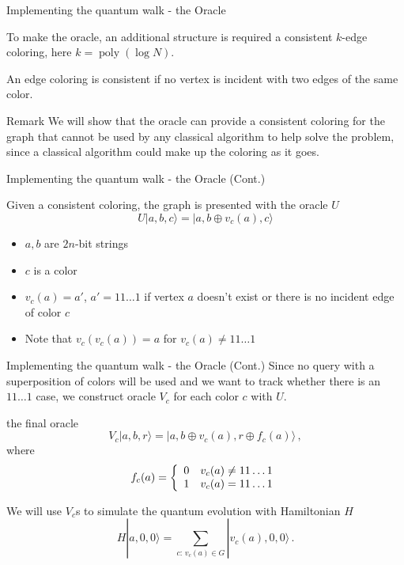 \documentclass{beamer}
\makeatletter
\newcommand{\<}{\langle}
\renewcommand{\>}{\rangle}
\newcommand{\be}{\begin{equation}}
\newcommand{\ee}{\end{equation}}
\newcommand{\cond}[1]{\left\{\begin{array}{l@{~~~}l}#1\end{array}\right.}
\newcommand{\poly}{\mathop{\mathrm{poly}}\nolimits}
\makeatother
\begin{document}
\begin{frame}{Implementing the quantum walk - the Oracle }

\begin{alertblock}{}
To make the oracle, an additional structure is required \newline 
a consistent $k$-edge coloring, here $k=\poly(\log N)$.
\end{alertblock}

\begin{definition}
An edge coloring is consistent if no vertex is incident with two edges of the same color.
\end{definition}

\begin{block}{Remark}
We will show that the oracle can provide a consistent coloring for the graph that cannot be used by any classical algorithm to help solve the problem, since a classical algorithm could make up the coloring as it goes. 
\end{block}

\end{frame}

\begin{frame}{Implementing the quantum walk - the Oracle (Cont.) }

\begin{block}{}
Given a consistent coloring, the graph is presented with the oracle $U$
\be
  U |a,b,c\> = |a,b \oplus v_c(a),c\>
\label{eq:graphoracle}
\ee
\begin{itemize}
    \item $a, b$ are $2n$-bit strings
    \item $c$ is a color
    \item $v_c(a) = a'$, $a'=11\ldots1$ if vertex $a$ doesn't exist or there is no incident edge of color $c$
    \item Note that  $v_c(v_c(a))=a$ for $v_c(a) \ne 11\ldots1$
    
\end{itemize}
\end{block}

\end{frame}


\begin{frame}{Implementing the quantum walk - the Oracle (Cont.) }
Since no query with a superposition of colors will be used and we want to track whether there is an $11\ldots1$ case, we construct oracle $V_c$ for each color $c$ with $U$.
\begin{block}{the final oracle}
\be
  V_c|a,b,r\> = |a,b \oplus v_c(a),r \oplus f_c(a)\>
\,,
\label{eq:simpleoracle}
\ee
where
\be
  f_c(a) = \cond{
      0 & v_c(a) \ne 11\ldots1 \\
      1 & v_c(a) = 11\ldots1 }
\ee
\end{block}
We will use $V_c$s to simulate the quantum evolution with Hamiltonian $H$
\be
  H |a, 0, 0\> = \sum_{c:\, v_c(a) \in G} |v_c(a),0,0\>
\,.
\label{eq:ham}
\ee


\end{frame}
\end{document}
